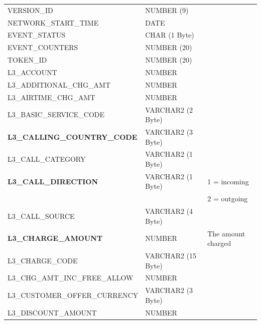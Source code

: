 \documentclass[12pt,twoside]{article}
\begin{document}
\begin{longtable}{lll}
 VERSION\_ID                             &  NUMBER (9)           &                            \\
 NETWORK\_START\_TIME                    &  DATE                 &                            \\
 EVENT\_STATUS                           &  CHAR (1 Byte)        &                            \\
 EVENT\_COUNTERS                         &  NUMBER (20)          &                            \\
 TOKEN\_ID                               &  NUMBER (20)          &                            \\
 L3\_ACCOUNT                             &  NUMBER               &                            \\
 L3\_ADDITIONAL\_CHG\_AMT                &  NUMBER               &                            \\
 L3\_AIRTIME\_CHG\_AMT                   &  NUMBER               &                            \\
 L3\_BASIC\_SERVICE\_CODE                &  VARCHAR2 (2 Byte)    &                            \\
 \textbf{L3\_CALLING\_COUNTRY\_CODE}     &  VARCHAR2 (3 Byte)    &                            \\
 L3\_CALL\_CATEGORY                      &  VARCHAR2 (1 Byte)    &                            \\
 \textbf{L3\_CALL\_DIRECTION}            &  VARCHAR2 (1 Byte)    &  1 = incoming              \\
                                         &                       &  2 = outgoing              \\
 L3\_CALL\_SOURCE                        &  VARCHAR2 (4 Byte)    &                            \\
 \textbf{L3\_CHARGE\_AMOUNT}             &  NUMBER               &  The amount charged        \\
 L3\_CHARGE\_CODE                        &  VARCHAR2 (15 Byte)   &                            \\
 L3\_CHG\_AMT\_INC\_FREE\_ALLOW          &  NUMBER               &                            \\
 L3\_CUSTOMER\_OFFER\_CURRENCY           &  VARCHAR2 (3 Byte)    &                            \\
 L3\_DISCOUNT\_AMOUNT                    &  NUMBER               &                            \\

\end{longtable}
\end{document}
